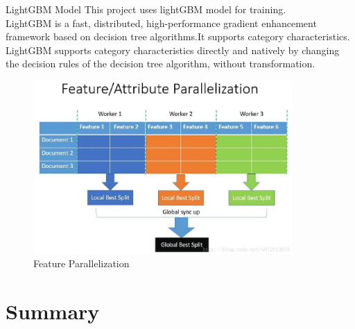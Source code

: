 \documentclass[
 size=14pt,
 paper=smartboard,  %
 mode=present, 		%
 display=slides, 	%
 style=tuliplab,  	%
 pauseslide,
 fleqn,leqno]{powerdot}
\begin{document}
\begin{slide}{LightGBM Model}
  This project uses lightGBM model for training.\\
  LightGBM is a fast, distributed, high-performance gradient enhancement framework
   based on decision tree algorithms.It supports category characteristics. \\
   LightGBM supports category characteristics directly and natively by changing the decision rules
  of the decision tree algorithm, without transformation.
  \begin{figure}[htbp]
    \centering
    \begin{minipage}[t]{0.48\textwidth}
      \centering
      \centerline{\includegraphics[width=0.88\textwidth]{logos/moxing.eps}}
      \vspace{-1.0em}
      \caption{Feature Parallelization}
    \end{minipage}
  \end{figure}
\end{slide}



\section{Summary}
\end{document}

